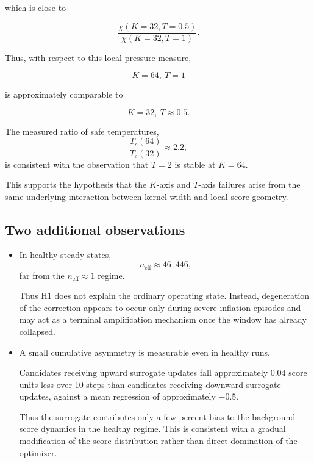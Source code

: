 \documentclass[11pt,a4paper]{article}
\newcommand{\neff}{n_{\mathrm{eff}}}
\begin{document}
which is close to

\[
\frac{
\chi(K=32,T=0.5)
}{
\chi(K=32,T=1)
}.
\]

Thus, with respect to this local pressure measure,

\[
K=64,\ T=1
\]

is approximately comparable to

\[
K=32,\ T\approx0.5.
\]

The measured ratio of safe temperatures,
\[
\frac{T_c(64)}{T_c(32)}
\approx2.2,
\]
is consistent with the observation that \(T=2\) is stable at \(K=64\).

This supports the hypothesis that the \(K\)-axis and \(T\)-axis failures arise
from the same underlying interaction between kernel width and local score
geometry.


\subsection*{Two additional observations}

\begin{itemize}[leftmargin=1.4em]

\item
In healthy steady states,
\[
\neff\approx46\text{--}446,
\]
far from the \(\neff\approx1\) regime.

Thus H1 does not explain the ordinary operating state.
Instead, degeneration of the correction appears to occur only during severe
inflation episodes and may act as a terminal amplification mechanism once the
window has already collapsed.

\item
A small cumulative asymmetry is measurable even in healthy runs.

Candidates receiving upward surrogate updates fall approximately 0.04 score
units less over 10 steps than candidates receiving downward surrogate updates,
against a mean regression of approximately \(-0.5\).

Thus the surrogate contributes only a few percent bias to the background score
dynamics in the healthy regime.
This is consistent with a gradual modification of the score distribution
rather than direct domination of the optimizer.

\end{itemize}


\end{document}
